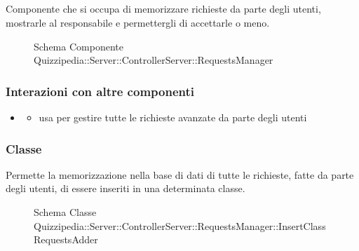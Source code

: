 \subsection{}
Componente che si occupa di memorizzare richieste da parte degli utenti, mostrarle al responsabile e permettergli di accettarle o meno.
\begin{figure}[H]
\centering
\noindent{}
\caption[Schema Componente Quizzipedia::Server::ControllerServer::RequestsManager]{Schema Componente Quizzipedia::Server::ControllerServer::RequestsManager}
\end{figure}
\subsubsection{Interazioni con altre componenti}
\begin{itemize}
\item {}
\begin{itemize}
\item usa  per gestire tutte le richieste avanzate da parte degli utenti
\end{itemize}
\end{itemize}
\subsubsection{Classe }
Permette la memorizzazione nella base di dati di tutte le richieste, fatte da parte degli utenti, di essere inseriti in una determinata classe.
\begin{figure}[H]
\centering
\noindent{}
\caption[Schema Classe InsertClassRequestsAdder]{Schema Classe Quizzipedia::Server::ControllerServer::RequestsManager::InsertClassRequestsAdder}
\end{figure}
